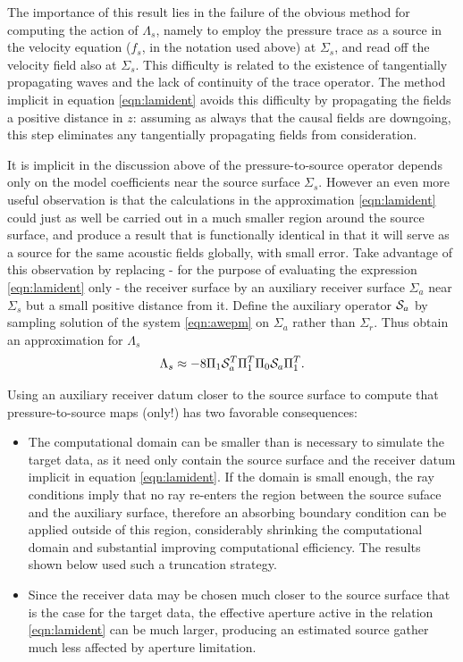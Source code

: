 \documentclass[12pt]{geophysics}
\begin{document}
The importance of this result lies in the failure of the obvious
method for computing the action of $\Lambda_s$, namely to
employ the pressure trace as a source in the velocity equation ($f_s$,
in the notation used above) at $\Sigma_s$, and read off the velocity
field also at $\Sigma_s$. This difficulty is related to the existence of
tangentially propagating waves and the lack of continuity of the trace
operator. The method implicit in equation \ref{eqn:lamident} avoids
this difficulty by propagating the fields a positive distance in $z$:
assuming as always that the causal fields are downgoing, this step
eliminates any tangentially propagating fields from consideration.

It is implicit in the discussion above of the pressure-to-source operator 
depends only on the model coefficients near the source surface
$\Sigma_s$. However an even more useful
observation is that the calculations in the approximation
\ref{eqn:lamident} could just as well be carried out in a much smaller
region around the source surface, and produce a result that is
functionally identical in that it will serve as a source for the same
acoustic fields globally, with small error. Take advantage of this
observation by replacing - for the purpose of evaluating the
expression \ref{eqn:lamident} only -  the receiver surface by an
auxiliary receiver surface $\Sigma_a$ near $\Sigma_s$ but a small positive
distance from it. Define the auxiliary operator ${\cal S}_a$ by
sampling solution of the system \ref{eqn:awepm} on $\Sigma_a$ rather
than $\Sigma_r$. Thus obtain an approximation for $\Lambda_s$
\begin{equation}
  \label{eqn:lamnear}
 \Lambda_s \approx -8\Pi_1{\cal S}_a^T\Pi_1^T\Pi_0 {\cal S}_a\Pi_1^T. 
\end{equation}

Using an auxiliary receiver datum closer to the source surface to
compute that pressure-to-source maps (only!) has two favorable consequences:
\begin{itemize}
\item The computational domain can be smaller than is necessary to
  simulate the target data, as it need only contain the source
  surface and the receiver datum implicit in
  equation \ref{eqn:lamident}. If the domain is small enough, the ray
  conditions imply that no ray re-enters the region between the source
  suface and the auxiliary surface, therefore an absorbing boundary
  condition can be applied outside of this region, considerably
  shrinking the computational domain and substantial improving computational
  efficiency. The results shown below used such a truncation strategy.
\item Since the receiver data may be chosen much closer to the
  source surface that is the case for the target data, the effective
  aperture active in the relation \ref{eqn:lamident} can be much
  larger, producing an estimated source gather much less affected by
  aperture limitation.
\end{itemize}
\end{document}
